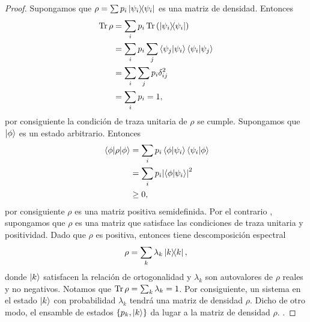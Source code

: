 \begin{proof}
	Supongamos que $\rho = \sum p_i\dyad{\psii}{\psii}$ es una matriz de
	densidad. Entonces 
	\begin{align*}
		\Tr \rho &= \sum _i p_i\Tr \qty(\dyad{\psii}{\psii})\\
		&= \sum _i p_i \sum _j \braket{\psi_j}{\psii}\braket{\psii}{\psi_j}\\
		&=\sum _i \sum _j p_i \delta _{ij}^2\\
		&=\sum _i p_i=1,
	\end{align*}
	por consiguiente la condición de traza unitaria de $\rho$ se cumple. 
	Supongamos que $\ket{\phi}$ es un estado arbitrario. Entonces
	\begin{align*}
		\matrixel{\phi}{\rho}{\phi} &= \sum _i p_i \braket{\phi}{\psii}
		\braket{\psii}{\phi} \\
		&=\sum _i p_i \abs{\braket{\phi}{\psii}}^2\\
		&\geq 0,
	\end{align*}
	por consiguiente $\rho$ es una matriz positiva semidefinida.  Por el 
	contrario , supongamos que $\rho$ es una matriz que satisface las condiciones
	de traza unitaria y positividad. Dado que $\rho$ es positiva, entonces
	tiene descomposición espectral  
	\begin{align*}
		\rho = \sum _k \lambda _k \dyad{k}{k},
	\end{align*}
	donde $\ket{k}$ satisfacen la relación de ortogonalidad y $\lambda _k$ son
	autovalores de $\rho$ reales y no negativos. Notamos que $\Tr \rho = \sum _k
	\lambda _k = 1$. Por consiguiente, un sistema en el estado $\ket{k}$ con 
	probabilidad $\lambda_k$ tendrá una matriz de densidad $\rho$. Dicho 
	de otro modo, el ensamble de estados $\{ p_k,\ket{k}\}$ da lugar a la matriz
	de densidad $\rho$. .
\end{proof}
